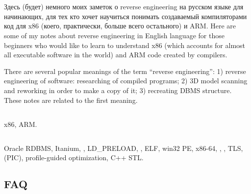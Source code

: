 ﻿%
\chapter{}

\IFRU
{Здесь (будет) немного моих заметок о \gls{reverse engineering} на русском языке для начинающих, 
для тех кто хочет научиться понимать создаваемый \CCpp компиляторами код для x86 (коего, 
практически, больше всего остального) и ARM.}
{Here are some of my notes about \gls{reverse engineering} in English language for 
those beginners who would like to learn to understand x86 (which accounts for almost 
all executable software in the world) and ARM code created by \CCpp compilers.}

{There are several popular meanings of the term ``\gls{reverse engineering}'': 
1) reverse engineering of software: researching of compiled programs;
2) 3D model scanning and reworking in order to make a copy of it;
3) recreating \ac{DBMS} structure.
These notes are related to the first meaning.}

\section{}

x86, ARM.

\section{}


Oracle RDBMS, Itanium, , LD\_PRELOAD,
, \ac{ELF}, win32 PE, x86-64, ,
, \ac{TLS},
 (PIC), profile-guided optimization, C++ STL.

\section{\ac{FAQ}}

